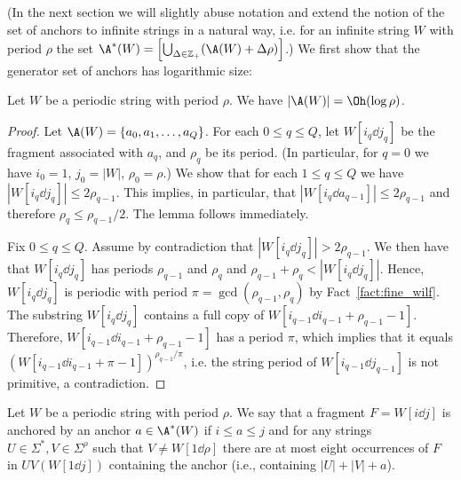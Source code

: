 (In the next section we will slightly abuse notation and extend the notion of the set of anchors to infinite strings in a natural way, i.e. for an infinite string $W$ with period $\rho$ the set $\A^\ast(W) = \left[\bigcup_{\Delta \in \mathbb{Z}_+} (\A(W) + \Delta \rho)\right]$.) 
We first show that the generator set of anchors has logarithmic size:

\begin{lemma}\label{lm:anchors}
Let $W$ be a periodic string with period $\rho$. We have $|\A(W)| = \Oh(\log \rho)$. 
\end{lemma}
\begin{proof}
Let $\A(W) = \{a_0, a_1, \ldots, a_Q\}$. For each $0 \le q \le Q$, let $W[i_q \dd j_q]$ be the fragment associated with $a_q$, and $\rho_q$ be its period. (In particular, for $q = 0$ we have $i_0 = 1$, $j_0 = |W|$, $\rho_0 = \rho$.) We show that for each $1 \le q \le Q$ we have $|W[i_q \dd j_q]| \le 2 \rho_{q-1}$. This implies, in particular, that $|W[i_q\dd a_{q-1}]| \le  2 \rho_{q-1}$ and therefore $\rho_q \leq \rho_{q-1} / 2$. The lemma follows immediately. 

Fix $0 \le q \le Q$. Assume by contradiction that $|W[i_q \dd j_q]| > 2 \rho_{q-1}$. We then have that $W[i_q \dd j_q]$ has periods $\rho_{q-1}$ and $\rho_q$ and $\rho_{q-1}+\rho_q < |W[i_q \dd j_q]|$. Hence, $W[i_q \dd j_q]$ is periodic with period $\pi = \gcd(\rho_{q-1},\rho_q)$ by Fact~\ref{fact:fine_wilf}. The substring $W[i_q \dd j_q]$ contains a full copy of $W[i_{q-1} \dd i_{q-1}+\rho_{q-1}-1]$. Therefore, $W[i_{q-1} \dd i_{q-1}+\rho_{q-1}-1]$ has a period $\pi$, which implies that it equals $(W[i_{q-1} \dd i_{q-1}+\pi-1])^{\rho_{q-1}/\pi}$, i.e. the string period of $W[i_{q-1} \dd j_{q-1}]$ is not primitive, a contradiction. 
\end{proof}


\begin{definition}
Let $W$ be a periodic string with period $\rho$. We say that a fragment $F = W[i \dd j]$ is anchored by an anchor $a \in \A^\ast(W)$ if $i \leq a \leq j$ and for any strings $U \in \Sigma^\ast, V \in \Sigma^\rho$ such that $V \neq W[1 \dd \rho]$ there are at most eight occurrences of $F$ in $UV(W[1\dd j])$ containing the anchor (i.e., containing $|U|+|V|+a$). 
\end{definition}

